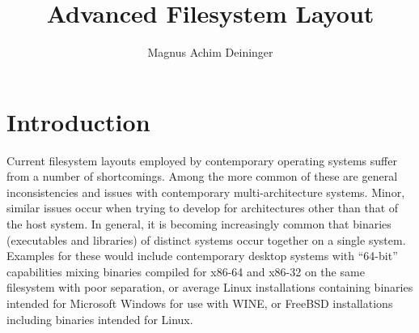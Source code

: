 \documentclass[a4paper,twoside,titlepage]{article}
\title{Advanced Filesystem Layout}
\author{Magnus Achim Deininger}
\begin{document}
\maketitle
\section{Introduction}
Current filesystem layouts employed by contemporary operating systems suffer
from a number of shortcomings. Among the more common of these are general
inconsistencies and issues with contemporary multi-architecture systems. Minor,
similar issues occur when trying to develop for architectures other than that of
the host system. In general, it is becoming increasingly common that binaries
(executables and libraries) of distinct systems occur together on a single
system. Examples for these would include contemporary desktop systems with
``64-bit'' capabilities mixing binaries compiled for x86-64 and x86-32 on the
same filesystem with poor separation, or average Linux installations containing
binaries intended for Microsoft Windows for use with WINE, or FreeBSD
installations including binaries intended for Linux.
\end{document}
